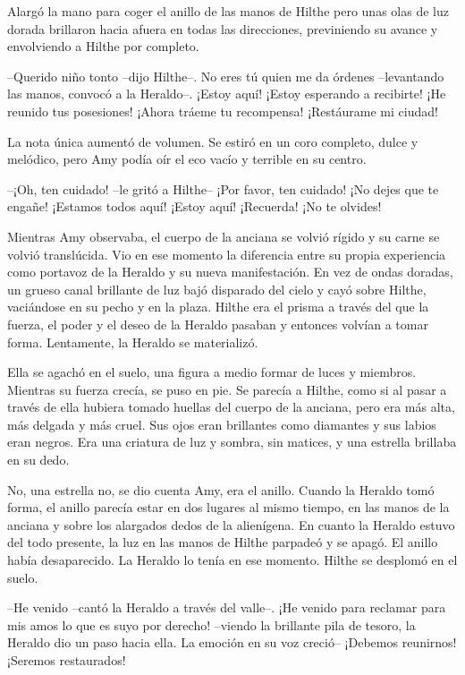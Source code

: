 {Alargó la mano para coger el anillo de las manos de Hilthe pero unas
	olas de luz dorada brillaron hacia afuera en todas las direcciones,
previniendo su avance y envolviendo a Hilthe por completo.}

{--Querido niño tonto --dijo Hilthe--. No eres tú quien me da órdenes
	--levantando las manos, convocó a la Heraldo--. ¡Estoy aquí! ¡Estoy
	esperando a recibirte! ¡He reunido tus posesiones! ¡Ahora tráeme tu
recompensa! ¡Restáurame mi ciudad!}

{La nota única aumentó de volumen. Se estiró en un coro completo, dulce
y melódico, pero Amy podía oír el eco vacío y terrible en su centro.}

{--¡Oh, ten cuidado! --le gritó a Hilthe-- ¡Por favor, ten cuidado!
	¡No dejes que te engañe! ¡Estamos todos aquí! ¡Estoy aquí! ¡Recuerda!
¡No te olvides!}

{Mientras Amy observaba, el cuerpo de la anciana se volvió rígido y su
	carne se volvió translúcida. Vio en ese momento la diferencia entre su
	propia experiencia como portavoz de la Heraldo y su nueva manifestación.
	En vez de ondas doradas, un grueso canal brillante de luz bajó disparado
	del cielo y cayó sobre Hilthe, vaciándose en su pecho y en la plaza.
	Hilthe era el prisma a través del que la fuerza, el poder y el deseo de
	la Heraldo pasaban y entonces volvían a tomar forma. Lentamente, la
Heraldo se materializó.}

{Ella se agachó en el suelo, una figura a medio formar de luces y
	miembros. Mientras su fuerza crecía, se puso en pie. Se parecía a
	Hilthe, como si al pasar a través de ella hubiera tomado huellas del
	cuerpo de la anciana, pero era más alta, más delgada y más cruel. Sus
	ojos eran brillantes como diamantes y sus labios eran negros. Era una
	criatura de luz y sombra, sin matices, y una estrella brillaba en su
dedo.}

{No, una estrella no, se dio cuenta Amy, era el anillo. Cuando la
	Heraldo tomó forma, el anillo parecía estar en dos lugares al mismo
	tiempo, en las manos de la anciana y sobre los alargados dedos de la
	alienígena. En cuanto la Heraldo estuvo del todo presente, la luz en las
	manos de Hilthe parpadeó y se apagó. El anillo había desaparecido. La
Heraldo lo tenía en ese momento. Hilthe se desplomó en el suelo.}

{--He venido --cantó la Heraldo a través del valle--. ¡He venido para
	reclamar para mis amos lo que es suyo por derecho! --viendo la brillante
	pila de tesoro, la Heraldo dio un paso hacia ella. La emoción en su voz
creció-- ¡Debemos reunirnos! ¡Seremos restaurados!}


